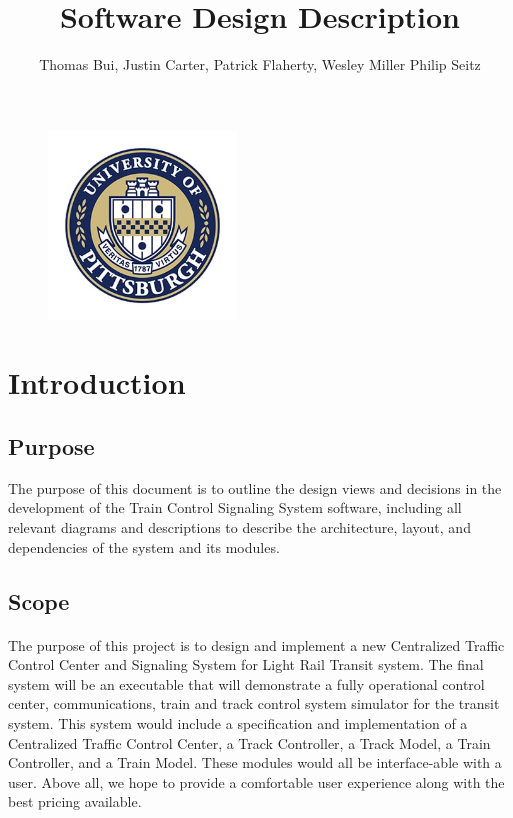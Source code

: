 \documentclass{article}
\title{\textbf{Software Design Description}}
\begin{document}
\begin{figure}
    \centering
    \includegraphics[height=5cm,width=5cm]{pitt-min.jpg}
\end{figure}

\author{Thomas Bui, Justin Carter, Patrick Flaherty, Wesley Miller Philip Seitz}

\date{}

\maketitle

\newenvironment{subs}
  {\adjustwidth{3em}{0pt}}
  {\endadjustwidth}

\pagebreak 

\tableofcontents
\newpage

\section{Introduction}
    
    \subsection{Purpose}
    The purpose of this document is to outline the design views and decisions in the development of the Train Control Signaling System software, including all relevant diagrams and descriptions to describe the architecture, layout, and dependencies of the system and its modules.
    
    \subsection{Scope}
    \paragraph{}
     The purpose of this project is to design and implement a new Centralized Traffic Control Center and Signaling System for Light Rail Transit system. The final system will be an executable that will demonstrate a fully operational control center, communications, train and track control system simulator for the transit system. This system would include a specification and implementation of a Centralized Traffic Control Center, a Track Controller, a Track Model, a Train Controller, and a Train Model. These modules would all be interface-able with a user. Above all, we hope to provide a comfortable user experience along with the best pricing available.
    
\end{document}
